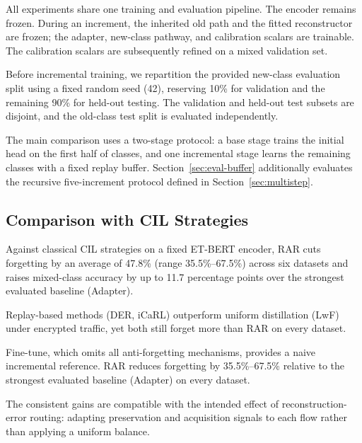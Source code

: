 All experiments share one training and evaluation pipeline. The encoder remains frozen. During an increment, the inherited old path and the fitted reconstructor are frozen; the adapter, new-class pathway, and calibration scalars are trainable. The calibration scalars are subsequently refined on a mixed validation set.

Before incremental training, we repartition the provided new-class evaluation split using a fixed random seed (42), reserving 10\% for validation and the remaining 90\% for held-out testing. The validation and held-out test subsets are disjoint, and the old-class test split is evaluated independently.

The main comparison uses a two-stage protocol: a base stage trains the initial head on the first half of classes, and one incremental stage learns the remaining classes with a fixed replay buffer. Section~\ref{sec:eval-buffer} additionally evaluates the recursive five-increment protocol defined in Section~\ref{sec:multistep}.

\subsection{Comparison with CIL Strategies}

Against classical CIL strategies on a fixed ET-BERT encoder, RAR cuts forgetting by an average of 47.8\% (range 35.5\%--67.5\%) across six datasets and raises mixed-class accuracy by up to 11.7 percentage points over the strongest evaluated baseline (Adapter).

Replay-based methods (DER, iCaRL) outperform uniform distillation (LwF) under encrypted traffic, yet both still forget more than RAR on every dataset.

Fine-tune, which omits all anti-forgetting mechanisms, provides a naive incremental reference. RAR reduces forgetting by 35.5\%--67.5\% relative to the strongest evaluated baseline (Adapter) on every dataset.

The consistent gains are compatible with the intended effect of reconstruction-error routing: adapting preservation and acquisition signals to each flow rather than applying a uniform balance.

